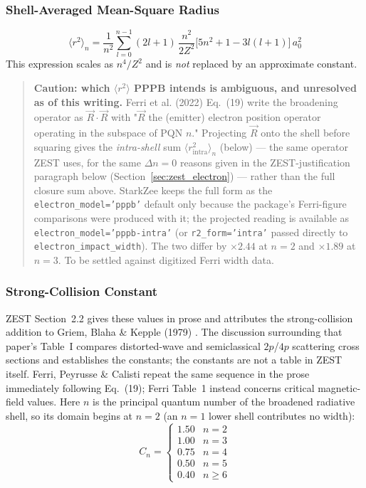 \documentclass[11pt,a4paper]{article}
\numberwithin{equation}{section}
\begin{document}
\subsubsection{Shell-Averaged Mean-Square Radius}
\begin{equation}
\langle r^2 \rangle_n = \frac{1}{n^2}\sum_{l=0}^{n-1}(2l+1)\,\frac{n^2}{2Z^2}\bigl[5n^2+1-3l(l+1)\bigr]\,a_0^2
\end{equation}
This expression scales as $n^4/Z^2$ and is \emph{not} replaced by an approximate constant.

\begin{quote}
\textbf{Caution: which $\langle r^2\rangle$ PPPB intends is ambiguous, and unresolved as of this writing.}
Ferri et al. (2022) Eq.~(19) write the broadening operator as $\vec R\cdot\vec R$ with
"$\vec R$ the (emitter) electron position operator operating in the subspace of PQN $n$."
Projecting $\vec R$ onto the shell before squaring gives the \emph{intra-shell} sum
$\langle r^2_\mathrm{intra}\rangle_n$ (below) — the same operator ZEST uses, for the same
$\Delta n=0$ reasons given in the ZEST-justification paragraph below (Section~\ref{sec:zest_electron}) —
rather than the full closure sum above.  StarkZee keeps the full form as the \texttt{electron\_model='pppb'}
default only because the package's Ferri-figure comparisons were produced with it; the projected reading is
available as \texttt{electron\_model='pppb-intra'} (or \texttt{r2\_form='intra'} passed directly to
\texttt{electron\_impact\_width}).  The two differ by $\times2.44$ at $n=2$ and $\times1.89$ at $n=3$.  To be
settled against digitized Ferri width data.
\end{quote}

\subsubsection{Strong-Collision Constant}
ZEST Section~2.2 \cite{Gilleron2018} gives these values in prose and attributes
the strong-collision addition to Griem, Blaha \& Kepple (1979)
\cite{griem1979}. The discussion surrounding that paper's Table~I compares
distorted-wave and semiclassical $2p$/$4p$ scattering cross sections and
establishes the constants; the constants are not a table in ZEST itself. Ferri,
Peyrusse \& Calisti \cite{ferri} repeat the same sequence in the prose
immediately following Eq.~(19); Ferri Table~1 instead concerns critical
magnetic-field values. Here $n$ is the principal quantum number of the broadened
radiative shell, so its domain begins at $n=2$ (an $n=1$ lower shell contributes no width):
\begin{equation}
C_n =
\begin{cases}
1.50 & n = 2 \\
1.00 & n = 3 \\
0.75 & n = 4 \\
0.50 & n = 5 \\
0.40 & n \ge 6
\end{cases}
\end{equation}
\end{document}
